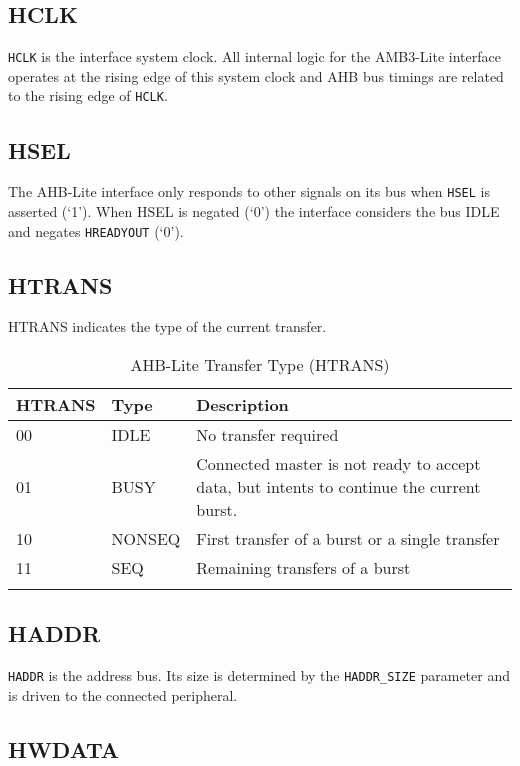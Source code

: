 \subsection{HCLK}\label{hclk}

\texttt{HCLK} is the interface system clock. All internal logic for the AMB3-Lite
interface operates at the rising edge of this system clock and AHB bus
timings are related to the rising edge of \texttt{HCLK}.

\subsection{HSEL}\label{hsel}

The AHB-Lite interface only responds to other signals on its bus when
\texttt{HSEL} is asserted (`1'). When HSEL is negated (`0') the interface
considers the bus IDLE and negates \texttt{HREADYOUT} (`0').

\pagebreak

\subsection{HTRANS}\label{htrans}

HTRANS indicates the type of the current transfer.

\begin{longtable}[]{@{}llp{11cm}@{}}
	\toprule
		HTRANS & Type   & Description\tabularnewline
	\midrule
	\endhead
		00     & IDLE   & No transfer required\tabularnewline
		01     & BUSY   & Connected master is not ready to accept data, but intents to continue the current burst.\tabularnewline
		10     & NONSEQ & First transfer of a burst or a single transfer\tabularnewline
		11     & SEQ    & Remaining transfers of a burst\tabularnewline
	\bottomrule
	\caption{AHB-Lite Transfer Type (HTRANS)}
\end{longtable}

\subsection{HADDR}\label{haddr}

\texttt{HADDR} is the address bus. Its size is determined by the \texttt{HADDR\_SIZE}
parameter and is driven to the connected peripheral.

\subsection{HWDATA}\label{hwdata}

